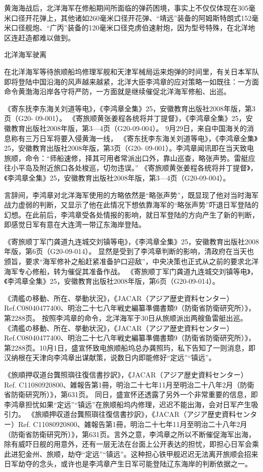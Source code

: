 \documentclass[12pt,UTF8]{ctexbook}
\begin{document}
黄海海战后，北洋海军在修船期间所面临的弹药困境，事实上不仅仅体现在305毫米口径开花弹上，其他诸如260毫米口径开花弹、“靖远”装备的阿姆斯特朗式152毫米口径舰炮、“广丙”装备的120毫米口径克虏伯速射炮，因为型号特殊，在北洋地区连赶造都难以做到。

北洋海军驶离

在北洋海军等待旅顺船坞修理军舰和天津军械局运来炮弹的时间里，有关日本军队即将登陆中国沿海的风声越来越紧，北洋大臣李鸿章的应对策略一如既往：一方面命令黄渤海沿岸各守将严防，一方面就是继续催促北洋海军修船、出巡。

《寄东抚李东海关刘道等电》，《李鸿章全集》25，安徽教育出版社2008年版，第3页（G20- 09-001）。
《寄旅顺黄张姜程各统将并丁提督》，《李鸿章全集》25，安徽教育出版社2008年版，第3—4页（G20-09-004）。
9月29日，来自中国海关的消息称有三万日军将要入侵黄海一线， 《寄东抚李东海关刘道等电》，《李鸿章全集》25，安徽教育出版社2008年版，第3页（G20- 09-001）。李鸿章闻讯即在当天致电旅顺，命令：“师船速修，择其可用者常派出口外，靠山巡查，略张声势。雷艇应往小平岛及附近旅口各处梭巡，切勿违误。” 《寄旅顺黄张姜程各统将并丁提督》，《李鸿章全集》25，安徽教育出版社2008年版，第3—4页（G20-09-004）。

言辞间，李鸿章对北洋海军使用的方略依然是“略张声势”，既显现了他对当时海军战力虚弱的判断，又显示了他在此情况下想依靠海军的“略张声势”吓退日军登陆的幻想。在此前后，李鸿章受各处情报的影响，就日军登陆的方向产生了新的判断，即感觉日军有意在大连湾一带辽东海岸登陆。

《寄旅顺丁军门龚道九连城交刘镇等电》，《李鸿章全集》25，安徽教育出版社2008年版，第6页（G20-09-014）。
显然是受到了李鸿章判断的影响，清政府在当天也颁旨，要求“海军修补之船赶紧准备护口迎敌”，中央决策也正式从之前的要求北洋海军专心修船，转为催促其准备作战。 《寄旅顺丁军门龚道九连城交刘镇等电》，《李鸿章全集》25，安徽教育出版社2008年版，第6页（G20-09-014）。

《清艦の移動、所在、挙動状況》，《JACAR（アジア歴史資料センター）Ref.C08040477400、明治二十七八年戦史編纂準備書類9（防衛省防衛研究所）》，第2288页。
按照李鸿章的命令，北洋海军于30日从旅顺派出两艘鱼雷艇出巡。 《清艦の移動、所在、挙動状況》，《JACAR（アジア歴史資料センター）Ref.C08040477400、明治二十七八年戦史編纂準備書類9（防衛省防衛研究所）》，第2288页。10月1日，盛宣怀致电旅顺船坞总办龚照玙，私下告知了一则消息，即汉纳根在天津向李鸿章出谋献策，说数日内即能修好“定远”“镇远”。

《旅順押収道台龔照璵往復信書抄訳》，《JACAR（アジア歴史資料センター）Ref. C11080920800、雑報告第1冊，明治二十七年11月至明治二十八年2月（防衛省防衛研究所）》，第631页。
同日，盛宣怀还透露了另外一个非常重要的信息，即李鸿章担忧如果“定远”“镇远”在旅顺船坞内修理，迟迟不能出海，会对日军产生吸引力。 《旅順押収道台龔照璵往復信書抄訳》，《JACAR（アジア歴史資料センター）Ref. C11080920800、雑報告第1冊，明治二十七年11月至明治二十八年2月（防衛省防衛研究所）》，第631页。言外之意，李鸿章之所以不断催促海军出海，除有威吓日舰的用意外，还有一层无法在台面上公开表达的担忧，即担心日军会乘此进犯金州、旅顺，劫夺“定远”“镇远”。这种担心铁甲舰迟迟无法离开旅顺会招来日军劫夺的念头，或许也是李鸿章产生日军可能登陆辽东海岸的判断依据之一。
\end{document}
